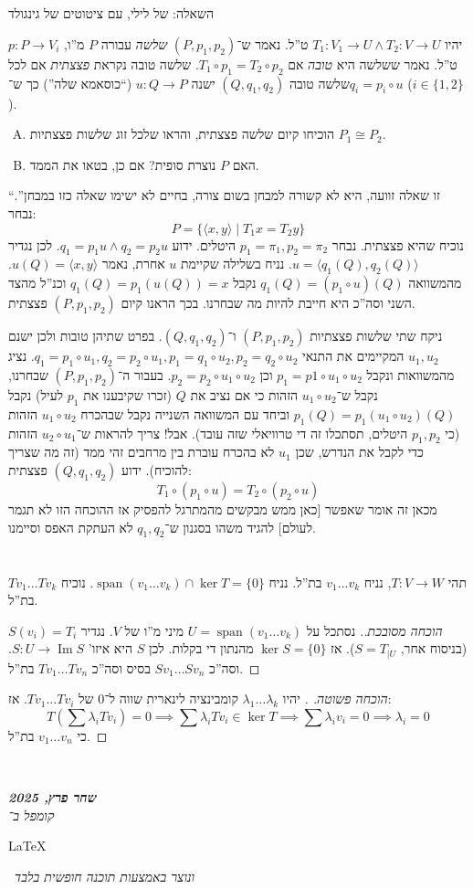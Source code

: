 \documentclass[]{article}
\newcommand\en[1] {\begin{otherlanguage}{english}#1\end{otherlanguage}}
\newcommand\ndoc  {\dotfill \\ \vfil {\begin{center}
			{\textbf{\textit{שחר פרץ, 2025}} \\
				\scriptsize \textit{קומפל ב־}\en{\LaTeX}\,\textit{ ונוצר באמצעות תוכנה חופשית בלבד}}
	\end{center}} \vfil	}
\newcommand\ra    {\rangle}
\newcommand\la    {\langle}
\DeclareMathOperator\Img   {Im}
\DeclareMathOperator{\Sp}     {span}
\newcommand\co        {\colon}
\renewcommand\lg      {\lambda}
\newcommand\cl [1]    {\left ( #1 \right )}
\theoremstyle{definition}
\begin{document}
	\section{}
	השאלה: של לילי, עם ציטוטים של גינגולד
	
	יהיו $T_1 \co V_1 \to U \land T_2 \co V \to U$ ט''ל. נאמר ש־$(P, p_1, p_2)$ \textit{שלשה} עבורה $P$ מ''ו, $p \co P \to V_i$ ט''ל. נאמר ששלשה היא \textit{טובה} אם $T_1 \circ p_1 = T_2 \circ p_2$. שלשה טובה נקראת \textit{פצצתית} אם לכל שלשה טובה $(Q, q_1, q_2)$ ישנה $u \co Q \to P$ (``כוסאמא שלה'') כך ש־$q_i = p_i \circ u$ ($i \in \{1, 2\}$). 
	\begin{enumerate}[A.]
		\item הוכיחו קיום שלשה פצצתית, והראו שלכל זוג שלשות פצצתיות $P_1 \cong P_2$. 
		\item האם $P$ נוצרת סופית? אם כן, בטאו את הממד. 
	\end{enumerate}
	``זו שאלה זוועה, היא לא קשורה למבחן בשום צורה, בחיים לא ישימו שאלה כזו במבחן''. 
	נבחר: 
	\[ P = \{\la x, y \ra \mid T_1 x = T_2 y\} \]
	נוכיח שהיא פצצתית. נבחר $p_1 = \pi_1, p_2 = \pi_2$ היטלים. ידוע $q_1 = p_1 u \land q_2 = p_2 u$. לכן נגדיר $u = \la q_1(Q), q_2(Q) \ra$. נניח בשלילה שקיימת $u$ אחרת, נאמר $u(Q) = \la x, y \ra$. מהמשוואה $q_1(Q) = (p_1 \circ u)(Q)$ נקבל $q_1(Q) = p_1(u(Q)) = x$ וכנ''ל מהצד השני וסה''כ היא חייבת להיות מה שבחרנו. בכך הראנו קיום $(P, p_1, p_2)$ פצצתית. 
	
	ניקח שתי שלשות פצצתיות $(P, p_1, p_2)$ ו־$(Q, q_1, q_2)$. בפרט שתיהן טובות ולכן ישנם $u_1, u_2$ המקיימים את התנאי $q_1 = p_1 \circ u_1, q_2 = p_2 \circ u_1, p_1 = q_1 \circ u_2, p_2 = q_2 \circ u_2$. נציג מהמשוואות ונקבל $p_1 = p1 \circ u_1 \circ u_2$ וכן $p_2 = p_2 \circ u_1 \circ u_2$. בעבור ה־$(P, p_1, p_2)$ שבחרנו, נקבל ש־$u_1 \circ u_2$ הזהות כי אם נציב את $Q$ (זכרו שקיבענו את $p_1$ לעיל) נקבל $p_1(Q) = p_1(u_1 \circ u_2)(Q)$ וביחד עם המשוואה השנייה נקבל שבהכרח $u_1 \circ u_2$ הזהות (כי $p_1, p_2$ היטלים, תסתכלו זה די טרוויאלי שזה עובד). אבל! צריך להראות ש־$u_2 \circ u_1$ הזהות כדי לקבל את הנדרש, שכן $u_1$ לא בהכרח עוברת בין מרחבים זהי ממד (זה מה שצריך להוכיח). 
	ידוע $(Q, q_1, q_2)$ פצצתית: 
	\[ T_1 \circ (p_1 \circ u) = T_2 \circ (p_2 \circ u) \]
	מכאן זה אומר שאפשר [כאן ממש מבקשים מהמתרגל להפסיק אז ההוכחה הזו לא תגמר לעולם] להגיד משהו בסגנון ש־$q_1, q_2$ לא העתקת האפס וסיימנו. 
	
	\section{}
	תהי $T \co V \to W$, נניח $v_1 \dots v_k$ בת''ל. נניח $\Sp(v_1 \dots v_k) \cap \ker T = \{0\}$. נוכיח $Tv_1 \dots Tv_{k}$ בת''ל. 
	\begin{proof}[הוכחה מסובכת.]
		נסתכל על $U = \Sp (v_1 \dots v_k)$ מיני מ''ו של $V$. נגדיר $S(v_i) = T_i$ (בניסוח אחר, $S = T_{|U}$). אז $\ker S = \{0\}$ מהנתון די בקלות. לכן $S$ היא איזו' $S \co U \to \Img S$. וסה''כ $Sv_1 \dots Sv_n$ בסיס וסה''כ $Tv_1 \dots Tv_n$ בת''ל. 
	\end{proof}
	
	\begin{proof}[הוכחה פשוטה. ]
		יהיו $\lg_1 \dots \lg_k$ קומבינציה לינארית שווה ל־$0$ של $Tv_1 \dots Tv_i$. אז: 
		\[ T\cl{\sum \lg_i Tv_i} = 0 \implies \sum \lg_i Tv_i \in \ker T \implies \sum \lg_i v_i = 0 \implies \lg_i = 0 \]
		כי $v_1 \dots v_n$ בת''ל. 
	\end{proof}
	
	
	
	\ndoc
\end{document}
